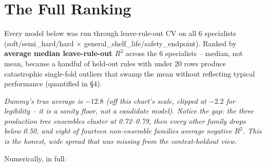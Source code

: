 \documentclass[11pt]{article}
\begin{document}
\section{The Full Ranking}
Every model below was run through leave-rule-out CV on all 6 specialists
(soft/semi\_hard/hard $\times$ general\_shelf\_life/safety\_endpoint).
Ranked by \textbf{average median leave-rule-out $R^2$} across the 6
specialists -- median, not mean, because a handful of held-out rules with
under 20 rows produce catastrophic single-fold outliers that swamp the
mean without reflecting typical performance (quantified in \S4).

\begin{center}
\end{center}
\vspace{-0.3em}
\textit{Dummy's true average is $-12.8$ (off this chart's scale, clipped at
$-2.2$ for legibility -- it is a sanity floor, not a candidate model).
Notice the gap: the three production tree ensembles cluster at
0.72--0.79, then every other family drops below 0.50, and eight of
fourteen non-ensemble families average \emph{negative} $R^2$. This is the
honest, wide spread that was missing from the context-holdout view.}

Numerically, in full:
\end{document}
